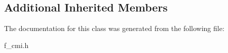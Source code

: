 \subsection*{Additional Inherited Members}


The documentation for this class was generated from the following file\+:\begin{DoxyCompactItemize}
\item 
f\+\_\+cmi.\+h\end{DoxyCompactItemize}
